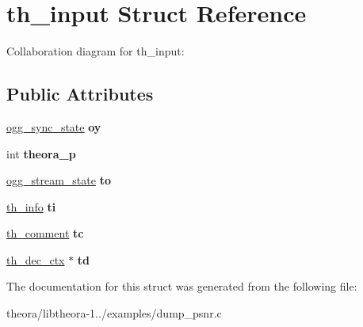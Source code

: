 \hypertarget{structth__input}{\section{th\+\_\+input Struct Reference}
\label{structth__input}
}


Collaboration diagram for th\+\_\+input\+:
\subsection*{Public Attributes}
\begin{DoxyCompactItemize}
\item 
\hypertarget{structth__input_a0cf319d461ead10c56552ce5799556fc}{\hyperlink{structogg__sync__state}{ogg\+\_\+sync\+\_\+state} {\bfseries oy}}\label{structth__input_a0cf319d461ead10c56552ce5799556fc}

\item 
\hypertarget{structth__input_a7b6248206ce427bee1d45fff424ca36f}{int {\bfseries theora\+\_\+p}}\label{structth__input_a7b6248206ce427bee1d45fff424ca36f}

\item 
\hypertarget{structth__input_a7839ad18b8b9507920298b9971d06d4b}{\hyperlink{structogg__stream__state}{ogg\+\_\+stream\+\_\+state} {\bfseries to}}\label{structth__input_a7839ad18b8b9507920298b9971d06d4b}

\item 
\hypertarget{structth__input_a27fc83a8ec91fbb86702f9f72f97ec48}{\hyperlink{structth__info}{th\+\_\+info} {\bfseries ti}}\label{structth__input_a27fc83a8ec91fbb86702f9f72f97ec48}

\item 
\hypertarget{structth__input_a315341eba7eb5cfcc0e8a98187bfe62c}{\hyperlink{structth__comment}{th\+\_\+comment} {\bfseries tc}}\label{structth__input_a315341eba7eb5cfcc0e8a98187bfe62c}

\item 
\hypertarget{structth__input_ac3643d35e67ec418fbcd9f20263d97d8}{\hyperlink{structth__dec__ctx}{th\+\_\+dec\+\_\+ctx} $\ast$ {\bfseries td}}\label{structth__input_ac3643d35e67ec418fbcd9f20263d97d8}

\end{DoxyCompactItemize}


The documentation for this struct was generated from the following file\+:\begin{DoxyCompactItemize}
\item 
theora/libtheora-\/1../examples/dump\+\_\+psnr.\+c\end{DoxyCompactItemize}
